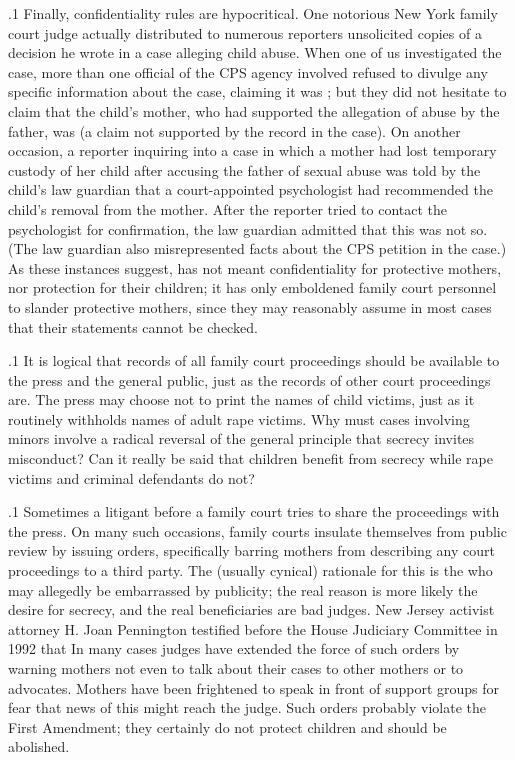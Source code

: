 \documentclass[11pt, twoside]{article}
\begin{document}
{\p.1{%
Finally, confidentiality rules are hypocritical. One notorious New
York family court judge actually distributed to numerous reporters unsolicited copies of a decision he wrote in a case alleging child abuse.
When one of us investigated the case, more than one official of the CPS
agency involved refused to divulge any specific information about the
case, claiming it was ; but they did not hesitate to
claim that the child’s mother, who had supported the allegation of abuse
by the father, was  (a claim not supported by the record
in the case). On another occasion, a reporter inquiring into a case in
which a mother had lost temporary custody of her child after accusing the father of sexual abuse was told by the child’s law guardian that
a court-appointed psychologist had recommended the child’s removal
from the mother. After the reporter tried to contact the psychologist for
confirmation, the law guardian admitted that this was not so. (The law
guardian also misrepresented facts about the CPS petition in the case.)
As these instances suggest,  has not meant confidentiality for protective mothers, nor protection for their children; it has only
emboldened family court personnel to slander protective mothers, since
they may reasonably assume in most cases that their statements cannot
be checked.
}%

\p.1{%
It is logical that records of all family court proceedings should be
available to the press and the general public, just as the records of other
court proceedings are. The press may choose not to print the names of
child victims, just as it routinely withholds names of adult rape victims. Why must cases involving minors involve a radical reversal of
the general principle that secrecy invites misconduct? Can it really be
said that children benefit from secrecy while rape victims and criminal
defendants do not?
}%

\p.1{%
Sometimes a litigant before a family court tries to share the proceedings with the press. On many such occasions, family courts insulate
themselves from public review by issuing  orders, specifically barring mothers from describing any court proceedings to a third party. The
(usually cynical) rationale for this is the  who
may allegedly be embarrassed by publicity; the real reason is more likely
the desire for secrecy, and the real beneficiaries are bad judges. New
Jersey activist attorney H. Joan Pennington testified before the House
Judiciary Committee in 1992 that  In many
cases judges have extended the force of such orders by warning mothers not even to talk about their cases to other mothers or to advocates.
Mothers have been frightened to speak in front of support groups for
fear that news of this might reach the judge. Such orders probably violate the First Amendment; they certainly do not protect children and
should be abolished.
}%

}
\end{document}
